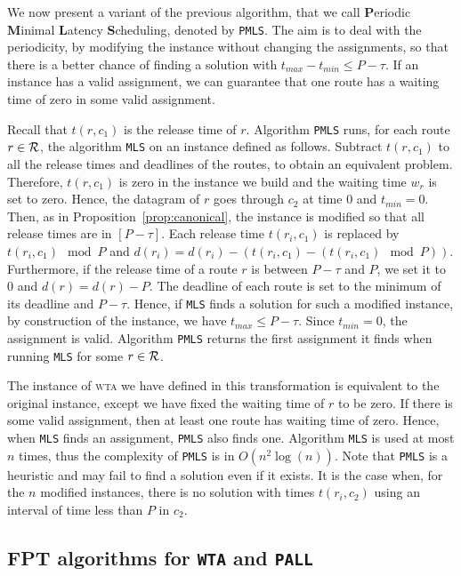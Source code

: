 \documentclass[a4paper,10pt]{journal}
\newcommand\MLS{\texttt{MLS}\xspace}
\newcommand\PMLS{\texttt{PMLS}\xspace}
\newcommand\wta{\textsc{wta}\xspace}
\begin{document}
     We now present a variant of the previous algorithm, that we call
     \textbf{P}eriodic \textbf{M}inimal \textbf{L}atency \textbf{S}cheduling, denoted by \PMLS. The aim is to deal with the periodicity, by modifying the instance without changing the assignments, so that there is a better chance of finding a solution with $t_{max}- t_{min} \leq P -\tau $.  If an instance has a valid assignment, we can guarantee that one route has a waiting time of zero in some valid assignment. 
     
      Recall that $t(r,c_1)$ is the release time of $r$. Algorithm \PMLS runs, for each route $r \in \cal{R}$, the algorithm \MLS on an instance defined as follows. Subtract $t(r,c_1)$ to all the release times and deadlines of the routes, to obtain an equivalent problem. Therefore, $t(r,c_1)$ is zero in the instance we build and the waiting time $w_r$ is set to zero. Hence, the datagram of $r$ goes through $c_2$ at time $0$ and $t_{min} = 0$.
     Then, as in Proposition~\ref{prop:canonical}, the instance is modified so that all release times are in $[P-\tau]$. Each release time $t(r_i,c_1)$ is replaced by $t(r_i,c_1) \mod P$ and $d(r_i) = d(r_i) - (t(r_i,c_1) - (t(r_i,c_1) \mod P))$. Furthermore, if the release time of a route $r$ is between $P-\tau$ and $P$, we set it to $0$ and $d(r) = d(r) - P$.  The deadline of each route is set to the minimum of its deadline and $P - \tau$. Hence, if \MLS finds a solution for such a modified instance, by construction of the instance, we have $t_{max} \leq P -\tau $. Since $t_{min} = 0$, the assignment is valid. Algorithm \PMLS returns the first assignment it finds when running \MLS for some $r \in \cal{R}$.

     The instance of \wta we have defined in this transformation is equivalent 
     to the original instance, except we have fixed the waiting time of 
     $r$ to be zero. If there is some valid assignment, then at least one route has waiting time of zero. Hence, when \MLS finds an assignment, \PMLS also finds one. Algorithm \MLS is used at most $n$ times, thus the complexity of \PMLS is in $O(n^2\log(n))$. Note that \PMLS is a heuristic and may fail to find a solution even if it exists. It is the case when, for the $n$ modified instances, there is no solution with times $t(r_i,c_2)$ using an interval of time less than $P$ in $c_2$. 


\subsection{FPT algorithms for \texttt{WTA} and \texttt{PALL}}
\end{document}
